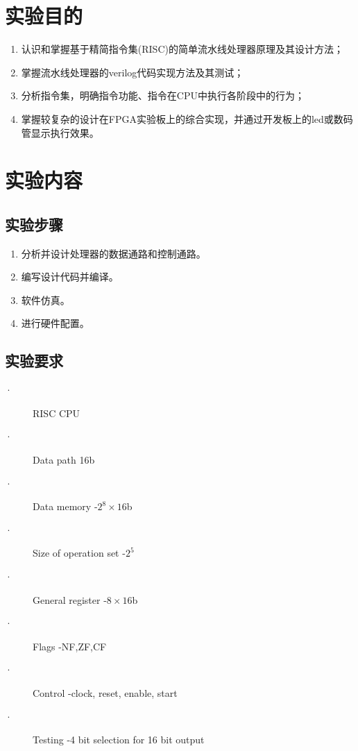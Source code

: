 \documentclass[10pt,a4paper,fleqn]{article}
\begin{document}
  \section{实验目的}
\begin{enumerate}
  \item 认识和掌握基于精简指令集(RISC)的简单流水线处理器原理及其设计方法；
  \item 掌握流水线处理器的verilog代码实现方法及其测试；
  \item 分析指令集，明确指令功能、指令在CPU中执行各阶段中的行为；
  \item 掌握较复杂的设计在FPGA实验板上的综合实现，并通过开发板上的led或数码管显示执行效果。
\end{enumerate}

  \section{实验内容}
  \subsection*{实验步骤}
  \begin{enumerate}
    \item 分析并设计处理器的数据通路和控制通路。
    \item 编写设计代码并编译。
    \item 软件仿真。
    \item 进行硬件配置。
  \end{enumerate}
  \subsection*{实验要求}
\begin{description}
  \item[·] RISC CPU
  \item[·] Data path 16b
  \item[·] Data memory -$2^8\times16$b
  \item[·] Size of operation set -$2^5$
  \item[·] General register -$8\times16$b
  \item[·] Flags -NF,ZF,CF
  \item[·] Control -clock, reset, enable, start
  \item[·] Testing -4 bit selection for 16 bit output
\end{description}
\end{document}
